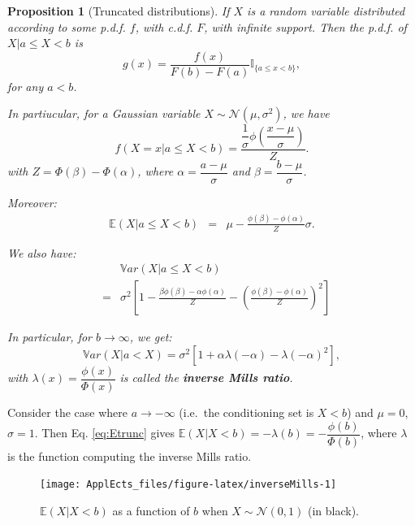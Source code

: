 \documentclass[
  12pt,
]{book}
\newtheorem{proposition}{Proposition}[chapter]
\theoremstyle{definition}
\theoremstyle{definition}
\theoremstyle{definition}
\theoremstyle{definition}
\theoremstyle{remark}
\begin{document}
\begin{proposition}[Truncated distributions]
\protect\hypertarget{prp:truncated}{}\label{prp:truncated}If \(X\) is a random variable distributed according to some p.d.f. \(f\), with c.d.f. \(F\), with infinite support. Then the p.d.f. of \(X|a \le X < b\) is
\[
g(x) = \frac{f(x)}{F(b)-F(a)}\mathbb{I}_{\{a \le x < b\}},
\]
for any \(a<b\).

In partiucular, for a Gaussian variable \(X \sim \mathcal{N}(\mu,\sigma^2)\), we have
\[
f(X=x|a\le X<b) = \dfrac{\dfrac{1}{\sigma}\phi\left(\dfrac{x - \mu}{\sigma}\right)}{Z}.
\]
with \(Z = \Phi(\beta)-\Phi(\alpha)\), where \(\alpha = \dfrac{a - \mu}{\sigma}\) and \(\beta = \dfrac{b - \mu}{\sigma}\).

Moreover:
\begin{eqnarray}
\mathbb{E}(X|a\le X<b) &=& \mu - \frac{\phi\left(\beta\right)-\phi\left(\alpha\right)}{Z}\sigma. \label{eq:Etrunc}
\end{eqnarray}

We also have:
\begin{eqnarray}
&& \mathbb{V}ar(X|a\le X<b) \nonumber\\
&=& \sigma^2\left[
1 -  \frac{\beta\phi\left(\beta\right)-\alpha\phi\left(\alpha\right)}{Z} -  \left(\frac{\phi\left(\beta\right)-\phi\left(\alpha\right)}{Z}\right)^2 \right] \label{eq:Vtrunc}
\end{eqnarray}

In particular, for \(b \rightarrow \infty\), we get:
\begin{equation}
\mathbb{V}ar(X|a < X) = \sigma^2\left[1 + \alpha\lambda(-\alpha) - \lambda(-\alpha)^2 \right], \label{eq:Vtrunc2}
\end{equation}
with \(\lambda(x)=\dfrac{\phi(x)}{\Phi(x)}\) is called the \textbf{inverse Mills ratio}.
\end{proposition}

Consider the case where \(a \rightarrow - \infty\) (i.e.~the conditioning set is \(X<b\)) and \(\mu=0\), \(\sigma=1\). Then Eq. \eqref{eq:Etrunc} gives \(\mathbb{E}(X|X<b) = - \lambda(b) = - \dfrac{\phi(b)}{\Phi(b)}\), where \(\lambda\) is the function computing the inverse Mills ratio.

\begin{figure}
\texttt{[image: ApplEcts\_files/figure-latex/inverseMills-1]} \caption{$\mathbb{E}(X|X<b)$ as a function of $b$ when $X\sim \mathcal{N}(0,1)$ (in black).}\label{fig:inverseMills}
\end{figure}
\end{document}
